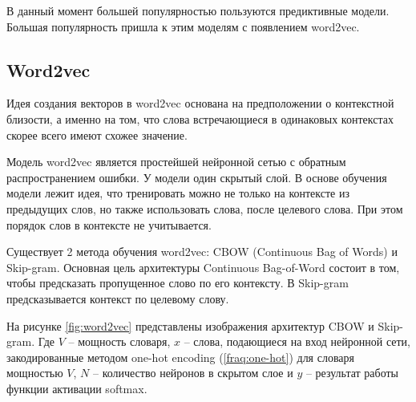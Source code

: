 \documentclass[a4paper,14pt]{article}
\begin{document}
В данный момент большей популярностью пользуются предиктивные модели.
Большая популярность пришла к этим моделям с появлением word2vec.

\subsection{Word2vec}
	
	Идея создания векторов в word2vec \cite{w2v} основана на предположении о контекстной близости, а именно на том, что слова встречающиеся в одинаковых контекстах скорее всего имеют схожее значение.
	
	Модель word2vec является простейшей нейронной сетью с обратным распространением ошибки.
	У модели один скрытый слой.
	В основе обучения модели лежит идея, что тренировать можно не только на контексте из предыдущих слов, но также использовать слова, после целевого слова.
	При этом порядок слов в контексте не учитывается.

	

Существует 2 метода обучения word2vec: CBOW (Continuous Bag of Words) и  Skip-gram.
Основная цель архитектуры Continuous Bag-of-Word состоит в том, чтобы предсказать пропущенное слово по его контексту.
В Skip-gram предсказывается контекст по целевому слову.

На рисунке \ref{fig:word2vec} представлены изображения архитектур CBOW и Skip-gram.
Где $V$ -- мощность словаря, $x$ -- слова, подающиеся на вход нейронной сети, закодированные методом one-hot encoding (\ref{fraq:one-hot}) для словаря мощностью $V$, $N$ -- количество нейронов в скрытом слое и $y$ -- результат работы функции активации softmax.
\end{document}
